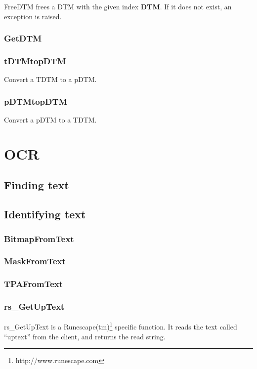 \documentclass[a4paper]{report}
\begin{document}
FreeDTM frees a DTM with the given index \textbf{DTM}. If it does not exist, an
exception is raised.

\subsection{GetDTM}

\subsection{tDTMtopDTM}

Convert a TDTM to a pDTM.

\subsection{pDTMtopDTM}

Convert a pDTM to a TDTM.

\chapter{OCR}

\section{Finding text}

\section{Identifying text}

\subsection{BitmapFromText}
\subsection{MaskFromText}
\subsection{TPAFromText}

\subsection{rs\_GetUpText}

rs\_GetUpText is a Runescape(tm)\footnote{http://www.runescape.com} specific function. It reads the text called
``uptext'' from the client, and returns the read string.
\end{document}

